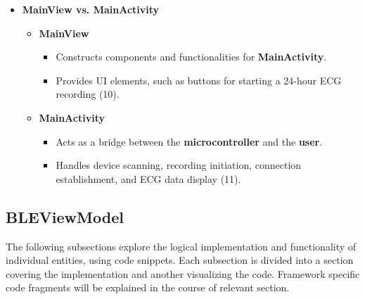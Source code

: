 {\begin{itemize}
		\item \textbf{MainView vs. MainActivity}  
		\begin{itemize}
			\item \textbf{MainView}  
			\begin{itemize}
				\item Constructs components and functionalities for \textbf{MainActivity}.  
				\item Provides UI elements, such as buttons for starting a 24-hour ECG recording (10).  
			\end{itemize}
			\item \textbf{MainActivity}  
			\begin{itemize}
				\item Acts as a bridge between the \textbf{microcontroller} and the \textbf{user}.  
				\item Handles device scanning, recording initiation, connection establishment, and ECG data display (11).  
			\end{itemize}
		\end{itemize}
	\end{itemize}
	
	
}



\subsection{BLEViewModel }
{\large 
	The following subsections explore the logical implementation and functionality of individual entities, using code snippets. Each subsection is divided into a section covering the implementation and another visualizing the code. Framework specific code fragments will be explained in the course of relevant section.	
	
}



